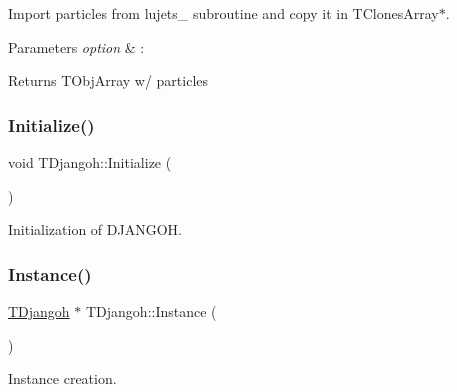 Import particles from lujets\+\_\+ subroutine and copy it in T\+Clones\+Array$\ast$. 


\begin{DoxyParams}{Parameters}
{\em option} & \+: \\
\hline
\end{DoxyParams}
\begin{DoxyReturn}{Returns}
T\+Obj\+Array w/ particles 
\end{DoxyReturn}
\mbox{\label{class_t_djangoh_a763cae78834404166df26ccd059bb301}} 
\subsubsection{\texorpdfstring{Initialize()}{Initialize()}}
{\footnotesize\ttfamily void T\+Djangoh\+::\+Initialize (\begin{DoxyParamCaption}{ }\end{DoxyParamCaption})}



Initialization of D\+J\+A\+N\+G\+OH. 

\mbox{\label{class_t_djangoh_a2e9871b8bec6326bb518f218dc87402c}} 
\subsubsection{\texorpdfstring{Instance()}{Instance()}}
{\footnotesize\ttfamily \hyperlink{class_t_djangoh}{T\+Djangoh} $\ast$ T\+Djangoh\+::\+Instance (\begin{DoxyParamCaption}{ }\end{DoxyParamCaption})\hspace{0.3cm}{\ttfamily [static]}}



Instance creation. 

\mbox{\label{class_t_djangoh_a20fbc4c9736f639e6211333c6113421a}} 
